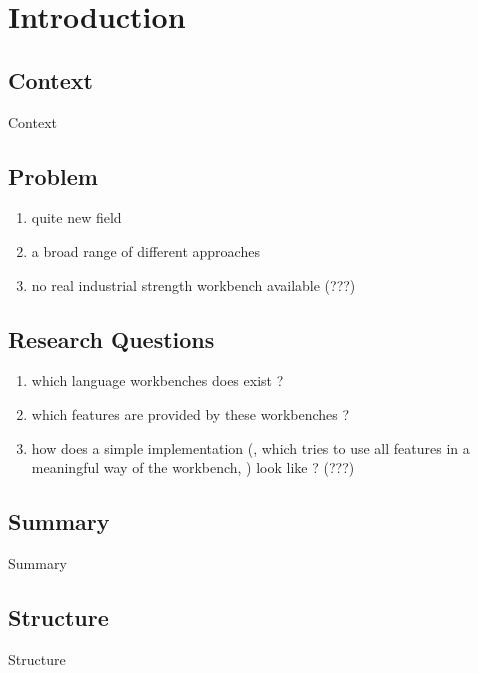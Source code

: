 \chapter{Introduction}

\cite{fowler2011domain}

\section{Context}

Context

\newpage

\section{Problem}

\begin{enumerate}
  \item quite new field
  \item a broad range of different approaches
  \item no real industrial strength workbench available (???)
\end{enumerate}

\newpage

\section{Research Questions}

\begin{enumerate}
  \item which language workbenches does exist ?
  \item which features are provided by these workbenches ?
  \item how does a simple implementation (, which tries to use all features in a meaningful way of the workbench, ) look like ? (???)
\end{enumerate}

\newpage

\section{Summary}

Summary

\newpage

\section{Structure}

Structure